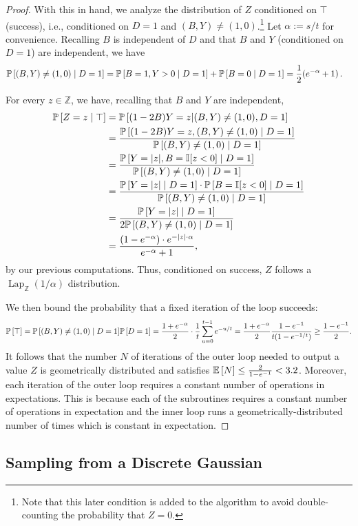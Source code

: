 \documentclass{jpc}
\newcommand{\discL}{\operatorname{Lap}_{\Z}} \newcommand{\discN}{\mathcal{N}_{\Z}}
\newcommand{\ex}[2]{{\ifx&#1& \mathbb{E} \else
\underset{#1}{\mathbb{E}} \fi \left[#2\right]}}
\newcommand{\pr}[2]{{\ifx&#1& \mathbb{P} \else
\underset{#1}{\mathbb{P}} \fi \left[#2\right]}}
\newcommand{\eqdef}{:=}
\newcommand{\Z}{\mathbb{Z}}
\begin{document}
\begin{proof}
With this in hand, we analyze the distribution of $Z$ conditioned on $\top$ (success), i.e., conditioned on $D=1$ and $(B,Y)\neq(1,0)$.\footnote{Note that this later condition is added to the algorithm to avoid double-counting the probability that $Z=0$.} Let $\alpha \eqdef s/t$ for convenience.  Recalling $B$ is independent of $D$ and that $B$ and $Y$ (conditioned on $D=1$) are independent, we have
\begin{align*}
    \pr{}{(B,Y)\neq (1,0) \mid D=1} &= \pr{}{ B=1, Y>0 \mid D=1}+\pr{}{B=0 \mid D=1} = \frac{1}{2}(e^{-\alpha}+1)\,.
\end{align*}

\noindent For every $z\in\Z$, we have, recalling that $B$ and $Y$ are independent,
\begin{align*}
    \pr{}{Z=z \mid \top} &= \pr{}{(1-2B)Y=z|(B,Y)\ne(1,0),D=1}\\
    &=  \frac{ \pr{}{(1-2B)Y=z, (B,Y)\neq (1,0) \mid D=1} }{  \pr{}{(B,Y)\neq (1,0) \mid D=1} } \\
    &=  \frac{\pr{}{Y=|z|, B=\mathbb{I}[z<0] \mid D=1} }{  \pr{}{(B,Y)\neq (1,0) \mid D=1} } \\
    &=  \frac{ \pr{}{Y=|z| \mid D=1} \cdot \pr{}{B=\mathbb{I}[z<0] \mid D=1} }{\pr{}{(B,Y)\neq (1,0) \mid D=1}}\\
    &=  \frac{ \pr{}{Y=|z| \mid D=1} }{2\pr{}{(B,Y)\neq (1,0) \mid D=1}}\\
    &= \frac{(1-e^{-\alpha}) \cdot e^{-|z| \cdot \alpha}}{e^{-\alpha}+1},
\end{align*}
by our previous computations. Thus, conditioned on success, $Z$ follows a $\discL(1/\alpha)$ distribution.

We then bound the probability that a fixed iteration of the loop succeeds:
\[
    \pr{}{\top} = \pr{}{(B,Y)\neq (1,0)\mid D=1}\pr{}{D=1} = \frac{1+e^{-\alpha}}{2}\cdot \frac{1}{t}\sum_{u=0}^{t-1}e^{-u/t} = \frac{1+e^{-\alpha}}{2}\frac{1-e^{-1}}{t(1-e^{-1/t})} \geq \frac{1-e^{-1}}{2}.
\]
It follows that the number $N$ of iterations of the outer loop needed to output a value $Z$ is geometrically distributed and satisfies $\ex{}{N} \leq \frac{2}{1-e^{-1}} < 3.2$. Moreover, each iteration of the outer loop requires a constant number of operations in expectations. This is because each of the subroutines requires a constant number of operations in expectation and the inner loop runs a geometrically-distributed number of times which is constant in expectation. \end{proof}

\subsection{Sampling from a Discrete Gaussian}
\end{document}
